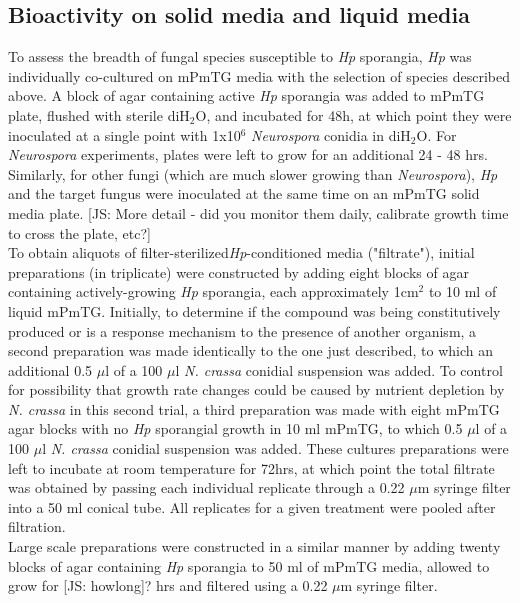 \subsection*{Bioactivity on solid media and liquid media}
To assess the breadth of fungal species susceptible to \textit{Hp} sporangia, \textit{Hp} was individually co-cultured on mPmTG media with the selection of species described above. A block of agar containing active \textit{Hp} sporangia was added to mPmTG plate, flushed with sterile diH$_{2}$O, and incubated for 48h, at which point they were inoculated at a single point with 1x10$^{6}$ \textit{Neurospora} conidia in diH$_{2}$O. For \textit{Neurospora} experiments, plates were left to grow for an additional 24 - 48 hrs.\\
\indent Similarly, for other fungi (which are much slower growing than \textit{Neurospora}), \textit{Hp} and the target fungus were inoculated at the same time on an mPmTG solid media plate. [JS: More detail - did you monitor them daily, calibrate growth time to cross the plate, etc?]\\
\indent To obtain aliquots of filter-sterilized\textit{Hp}-conditioned media ("filtrate"), initial preparations (in triplicate) were constructed by adding eight blocks of agar containing actively-growing \textit{Hp} sporangia, each approximately 1cm$^{2}$ to 10 ml of liquid mPmTG. Initially, to determine if the compound was being constitutively produced or is a response mechanism to the presence of another organism, a second preparation was made identically to the one just described, to which an additional 0.5 $\mu$l of a 100 $\mu$l  \textit{N. crassa} conidial suspension was added. To control for possibility that growth rate changes could be caused by nutrient depletion by \textit{N. crassa} in this second trial, a third preparation was made with eight mPmTG agar blocks with no \textit{Hp} sporangial growth in 10 ml mPmTG, to which 0.5 $\mu$l of a 100 $\mu$l \textit{N. crassa} conidial suspension was added. These cultures preparations were left to incubate at room temperature for 72hrs, at which point the total filtrate was obtained by passing each individual replicate through a 0.22 $\mu$m syringe filter into a 50 ml conical tube. All replicates for a given treatment were pooled after filtration. \\
\indent Large scale preparations were constructed in a similar manner by adding twenty blocks of agar containing \textit{Hp} sporangia to 50 ml of mPmTG media, allowed to grow for [JS: howlong]? hrs and filtered using a 0.22 $\mu$m syringe filter.\\

